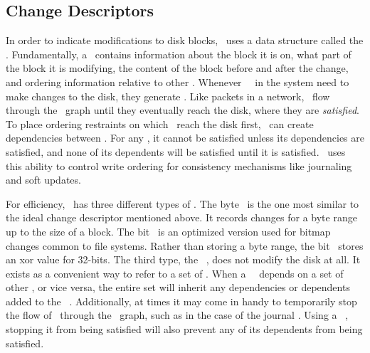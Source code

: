 \subsection{Change Descriptors}
\label{sec:chdescs}

In order to indicate modifications to disk blocks, \Kudos\ uses a data
structure called the \chdesc. Fundamentally, a \chdesc\ contains
information about the block it is on, what part of the block it is modifying,
the content of the block before and after the change, and ordering information
relative to other \chdescs. Whenever \Kudos\ \modules\ in the system
need to make changes to the disk, they generate \chdescs. Like
packets in a network, \chdescs\ flow through the \module\ graph until
they eventually reach the disk, where they are \emph{satisfied}. To place
ordering restraints on which \chdescs\ reach the disk first,
\modules\ can create dependencies between \chdescs. For any \chdesc,
it cannot be satisfied unless its dependencies are satisfied, and none of its
dependents will be satisfied until it is satisfied. \Kudos\ uses this ability
to control write ordering for consistency mechanisms like journaling and soft
updates.

For efficiency, \Kudos\ has three different types of \chdescs.
The byte \chdesc\ is the one most similar to the ideal change
descriptor mentioned above. It records changes for a byte range up to the size
of a block. The bit \chdesc\ is an optimized version used for
bitmap changes common to file systems. Rather than storing a byte range, the
bit \chdesc\ stores an xor value for 32-bits. The third type, the
\noop\ \chdesc, does not modify the disk at all. It exists as a
convenient way to refer to a set of \chdescs. When a
\noop\ \chdesc\ depends on a set of other \chdesc, or vice versa, the
entire set will inherit any dependencies or dependents added to the
\noop\ \chdesc. Additionally, at times it may come in handy to temporarily
stop the flow of \chdescs\ through the \module\ graph, such as in the
case of the journal \module. Using a \noop\ \chdesc, stopping it from
being satisfied will also prevent any of its dependents from being satisfied.

